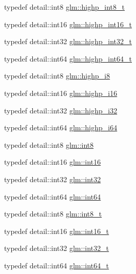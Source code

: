 \begin{CompactItemize}
\item 
typedef detail::int8 \hyperlink{group__gtc__type__precision_g417701b99e6e7992f35ab2ef694f88b2}{glm::highp\_\-int8\_\-t}
\item 
typedef detail::int16 \hyperlink{group__gtc__type__precision_g07d318d61472e75238e53b9642227672}{glm::highp\_\-int16\_\-t}
\item 
typedef detail::int32 \hyperlink{group__gtc__type__precision_g783d077a513c1f475f6cdb406b4238c3}{glm::highp\_\-int32\_\-t}
\item 
typedef detail::int64 \hyperlink{group__gtc__type__precision_g0f5186bde44471133b08057cae8a51ac}{glm::highp\_\-int64\_\-t}
\item 
typedef detail::int8 \hyperlink{group__gtc__type__precision_g8b9eb0b24cce7f14478bfcacb53ce839}{glm::highp\_\-i8}
\item 
typedef detail::int16 \hyperlink{group__gtc__type__precision_ga04399853952dbce29cb62e2432f350a}{glm::highp\_\-i16}
\item 
typedef detail::int32 \hyperlink{group__gtc__type__precision_g197d19b585222da57d70238a5cfc2be8}{glm::highp\_\-i32}
\item 
typedef detail::int64 \hyperlink{group__gtc__type__precision_gd3cb9a0ac0266ea2c51c6fac256345d1}{glm::highp\_\-i64}
\item 
typedef detail::int8 \hyperlink{group__gtc__type__precision_g96254f9c1c4506fc8eb5cf3301ce8565}{glm::int8}
\item 
typedef detail::int16 \hyperlink{group__gtc__type__precision_g2945a61d12771f8954994fcddf02b021}{glm::int16}
\item 
typedef detail::int32 \hyperlink{group__gtc__type__precision_g632d8b25f6b61659f39ea4321fab92a4}{glm::int32}
\item 
typedef detail::int64 \hyperlink{group__gtc__type__precision_g435d75819cce297cc5fa21bd84ef89a5}{glm::int64}
\item 
typedef detail::int8 \hyperlink{group__gtc__type__precision_g673898d450b2a91186f3c4f40c5f8633}{glm::int8\_\-t}
\item 
typedef detail::int16 \hyperlink{group__gtc__type__precision_gf89ee61e0d34aa4a462104b7ae7f2da6}{glm::int16\_\-t}
\item 
typedef detail::int32 \hyperlink{group__gtc__type__precision_gb870c0eb6f525b0c8c4716762e0fc3a8}{glm::int32\_\-t}
\item 
typedef detail::int64 \hyperlink{group__gtc__type__precision_g6abb23fbf4e39c50ec5341160b5da5ab}{glm::int64\_\-t}
\item 

\end{CompactItemize}
